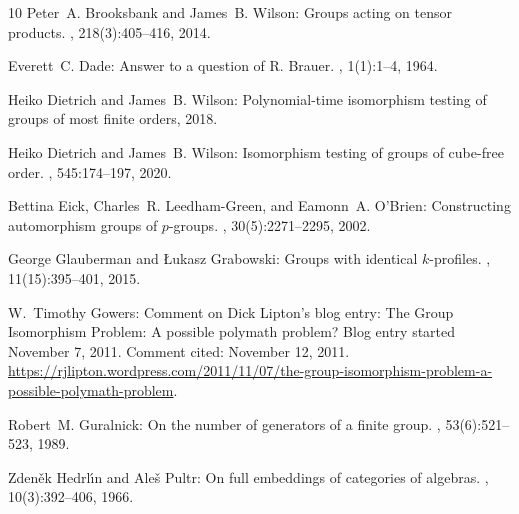 \documentclass[11pt]{article}
\numberwithin{equation}{section}
\theoremstyle{definition}
\theoremstyle{plain}
\numberwithin{equation}{section}
\theoremstyle{plain}       %
\theoremstyle{remark}
\theoremstyle{definition}
\numberwithin{figure}{section}
\numberwithin{table}{section}
\begin{document}
\begin{thebibliography}{10}
{\sc Peter~A. Brooksbank and James~B. Wilson}: Groups acting on tensor
  products.
, 218(3):405--416, 2014.

{\sc Everett~C. Dade}: Answer to a question of {R. Brauer}.
, 1(1):1--4, 1964.
\newblock [\epfmtdoi{10.1016/0021-8693(64)90002-X}]

{\sc Heiko Dietrich and James~B. Wilson}: Polynomial-time isomorphism testing
  of groups of most finite orders, 2018.

{\sc Heiko Dietrich and James~B. Wilson}: Isomorphism testing of groups of
  cube-free order.
, 545:174--197, 2020.

{\sc Bettina Eick, Charles~R. Leedham-Green, and Eamonn~A. O'Brien}:
  Constructing automorphism groups of $p$-groups.
, 30(5):2271--2295, 2002.

{\sc George Glauberman and {\L}ukasz Grabowski}: Groups with identical
  $k$-profiles.
, 11(15):395--401, 2015.

{\sc W.~Timothy Gowers}: Comment on {D}ick {L}ipton's blog entry: The {G}roup
  {I}somorphism {P}roblem: A possible polymath problem?
\newblock Blog entry started November 7, 2011. Comment cited: November 12,
  2011.
  \href{https://rjlipton.wordpress.com/2011/11/07/the-group-isomorphism-problem-a-possible-polymath-problem}{https://rjlipton.wordpress.com/2011/11/07/the-group-isomorphism-problem-a-possible-polymath-problem}.

{\sc Robert~M. Guralnick}: On the number of generators of a finite group.
, 53(6):521--523, 1989.
\newblock [\epfmtdoi{10.1007/BF01199809}]

{\sc Zden{\v e}k Hedrl\'{\i}n and Ale{\v s} Pultr}: On full embeddings of
  categories of algebras.
, 10(3):392--406, 1966.


\end{thebibliography}
\end{document}
